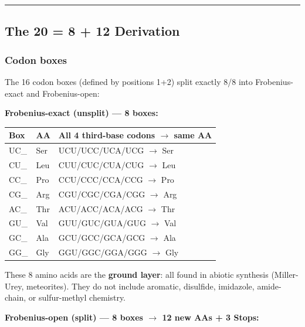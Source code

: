 \documentclass[12pt,a4paper]{article}
\begin{document}
\begin{center}
\rule{0.5\textwidth}{0.4pt}
\end{center}

\subsection{The 20 = 8 + 12 Derivation}

\subsubsection{Codon boxes}

The 16 codon boxes (defined by positions 1+2) split exactly 8/8 into
Frobenius-exact and Frobenius-open:

\textbf{Frobenius-exact (unsplit) --- 8 boxes:}

\begin{table}[htbp]
\centering
\small
{}
\begin{tabularx}{\textwidth}{>{\centering\arraybackslash}X >{\centering\arraybackslash}X >{\centering\arraybackslash}X}
\toprule
\rowcolor{gray!25}\textbf{Box} & \textbf{AA} & \textbf{All 4 third-base codons $\rightarrow$ same AA} \\
\midrule
\rowcolors{1}{white}{gray!10}
UC\_ & Ser & UCU/UCC/UCA/UCG $\rightarrow$ Ser \\
CU\_ & Leu & CUU/CUC/CUA/CUG $\rightarrow$ Leu \\
CC\_ & Pro & CCU/CCC/CCA/CCG $\rightarrow$ Pro \\
CG\_ & Arg & CGU/CGC/CGA/CGG $\rightarrow$ Arg \\
AC\_ & Thr & ACU/ACC/ACA/ACG $\rightarrow$ Thr \\
GU\_ & Val & GUU/GUC/GUA/GUG $\rightarrow$ Val \\
GC\_ & Ala & GCU/GCC/GCA/GCG $\rightarrow$ Ala \\
GG\_ & Gly & GGU/GGC/GGA/GGG $\rightarrow$ Gly \\
\bottomrule
\end{tabularx}
\end{table}

These 8 amino acids are the \textbf{ground layer}: all found in abiotic synthesis
(Miller-Urey, meteorites). They do not include aromatic, disulfide, imidazole,
amide-chain, or sulfur-methyl chemistry.

\textbf{Frobenius-open (split) --- 8 boxes $\rightarrow$ 12 new AAs + 3 Stops:}
\end{document}
